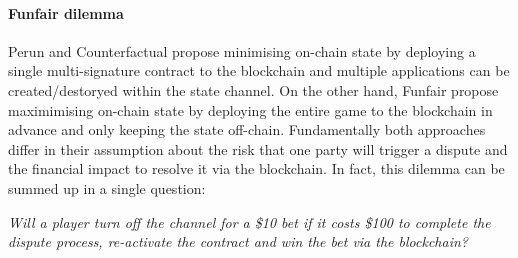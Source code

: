 \documentclass{llncs}
\begin{document}

\paragraph{Funfair dilemma} 
Perun and Counterfactual propose minimising on-chain state by deploying a single multi-signature contract to the blockchain and multiple applications can be created/destoryed within the state channel. 
On the other hand, Funfair propose maximimising on-chain state by deploying the entire game to the blockchain in advance and only keeping the state off-chain. 
Fundamentally both approaches differ in their assumption about the risk that one party will trigger a dispute and the financial impact to resolve it via the blockchain. 
In fact, this dilemma can be summed up in a single question:

\begin{center}
\textit{Will a player turn off the channel for a \$10 bet if it costs \$100 to complete the dispute process, re-activate the contract and win the bet via the blockchain?} 
\end{center} 
\end{document}
